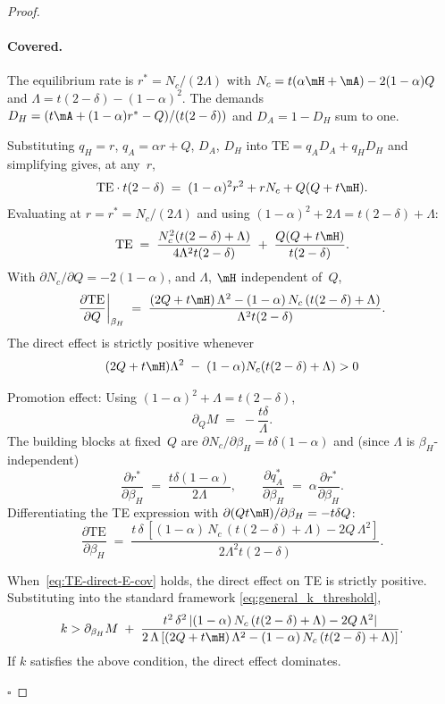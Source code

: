 \begin{proof}
\paragraph{Covered.}
The equilibrium rate is $r^* = N_c/(2\Lambda)$ with $N_c = t(\alpha\mH + \mA) - 2(1-\alpha)Q$ and $\Lambda = t(2-\delta) - (1-\alpha)^2$. The demands $D_H = (t\mA + (1-\alpha)r^* - Q)/(t(2-\delta))$ and $D_A = 1 - D_H$ sum to one.

Substituting $q_H = r$, $q_A = \alpha r + Q$, $D_A$, $D_H$ into $\text{TE} = q_A D_A + q_H D_H$ and simplifying gives, at any~$r$,
\[
\text{TE}\cdot t(2-\delta)
\;=\; (1-\alpha)^2 r^2 + r N_c + Q(Q + t\mH).
\]
Evaluating at $r = r^* = N_c/(2\Lambda)$ and using $(1-\alpha)^2 + 2\Lambda = t(2-\delta) + \Lambda$:
\[
\text{TE}
\;=\; \frac{N_c^2(t(2-\delta) + \Lambda)}{4\Lambda^2 t(2-\delta)}
\;+\; \frac{Q(Q + t\mH)}{t(2-\delta)}.
\]
With $\partial N_c/\partial Q = -2(1-\alpha)$, and $\Lambda$, $\mH$ independent of~$Q$,
\[
\frac{\partial \text{TE}}{\partial Q}\bigg|_{\beta_H}
\;=\; \frac{(2Q + t\mH)\,\Lambda^2 - (1-\alpha)\,N_c\,(t(2-\delta) + \Lambda)}{\Lambda^2 t(2-\delta)}.
\]
The direct effect is strictly positive whenever
\begin{equation}\label{eq:TE-direct-E-cov}
(2Q + t\mH)\Lambda^2 \;-\; (1-\alpha)N_c(t(2-\delta)+\Lambda)>0
\end{equation}


Promotion effect:
Using $(1-\alpha)^2 + \Lambda = t(2-\delta)$,
\[
\partial_Q M
\;=\; -\frac{t\delta}{\Lambda}.
\]
The building blocks at fixed~$Q$ are $\partial N_c/\partial\beta_H = t\delta(1-\alpha)$ and (since $\Lambda$ is $\beta_H$-independent)
\[
\frac{\partial r^*}{\partial\beta_H}
\;=\; \frac{t\delta(1-\alpha)}{2\Lambda},
\qquad
\frac{\partial q_A^*}{\partial\beta_H} \;=\; \alpha\frac{\partial r^*}{\partial\beta_H}.
\]
Differentiating the TE expression with $\partial(Q t\mH)/\partial\beta_H = -t\delta Q$:
\[
\frac{\partial\text{TE}}{\partial\beta_H}
\;=\; \frac{t\,\delta\,[(1-\alpha)\,N_c\,(t(2-\delta)+\Lambda) - 2Q\,\Lambda^2]}{2\Lambda^2 t(2-\delta)}.
\]


When~\eqref{eq:TE-direct-E-cov} holds, the direct effect on TE is strictly positive. Substituting into the standard framework \eqref{eq:general_k_threshold},
\begin{equation}\label{eq:kbar-Q-TE-E-cov}
k> \partial_{\beta_H}M
\;+\; \frac{t^{2}\,\delta^{2}\,|(1-\alpha)\,N_c\,(t(2-\delta)+\Lambda) - 2Q\,\Lambda^2|}{2\,\Lambda\,[(2Q + t\mH)\,\Lambda^2 - (1-\alpha)\,N_c\,(t(2-\delta) + \Lambda)]}.
\end{equation}
If $k$ satisfies the above condition, the direct effect dominates. 


\hfill $\square$
\end{proof}



